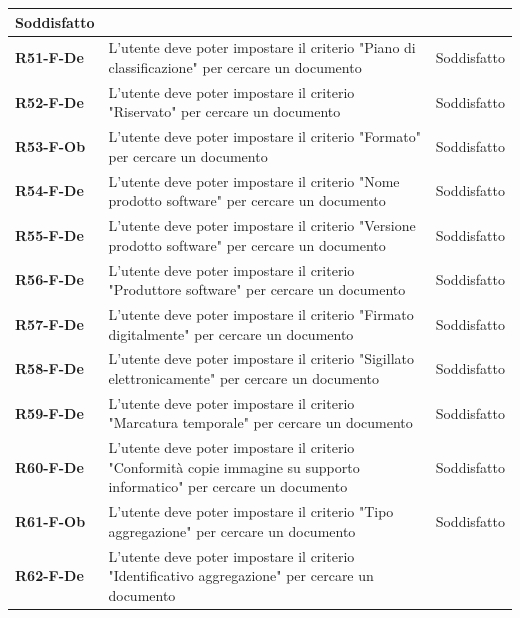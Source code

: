 \documentclass[a4paper,12pt]{article}
\begin{document}
{{{\begin{longtable}{|>{\centering\arraybackslash}m{}|>{\centering\arraybackslash}m{}|>{\centering\arraybackslash}m{}|}
                Soddisfatto \\ 
                \hline
                \textbf{R51-F-De} & L'utente deve poter impostare il criterio "Piano di classificazione" per cercare un documento & 
                Soddisfatto \\ 
                \hline
                \textbf{R52-F-De} & L'utente deve poter impostare il criterio "Riservato" per cercare un documento & 
                Soddisfatto \\ 
                \hline
                \textbf{R53-F-Ob} & L'utente deve poter impostare il criterio "Formato" per cercare un documento & 
                Soddisfatto \\ 
                \hline
                \textbf{R54-F-De} & L'utente deve poter impostare il criterio "Nome prodotto software" per cercare un documento & 
                Soddisfatto \\ 
                \hline
                \textbf{R55-F-De} & L'utente deve poter impostare il criterio "Versione prodotto software" per cercare un documento & 
                Soddisfatto \\ 
                \hline
                \textbf{R56-F-De} & L'utente deve poter impostare il criterio "Produttore software" per cercare un documento & 
                Soddisfatto \\ 
                \hline
                \textbf{R57-F-De} & L'utente deve poter impostare il criterio "Firmato digitalmente" per cercare un documento & 
                Soddisfatto \\ 
                \hline
                \textbf{R58-F-De} & L'utente deve poter impostare il criterio "Sigillato elettronicamente" per cercare un documento & 
                Soddisfatto \\ 
                \hline
                \textbf{R59-F-De} & L'utente deve poter impostare il criterio "Marcatura temporale" per cercare un documento & 
                Soddisfatto \\ 
                \hline
                \textbf{R60-F-De} & L'utente deve poter impostare il criterio "Conformità copie immagine su supporto informatico" per cercare un documento & 
                Soddisfatto \\ 
                \hline
                \textbf{R61-F-Ob} & L'utente deve poter impostare il criterio "Tipo aggregazione" per cercare un documento & 
                Soddisfatto \\ 
                \hline
                \textbf{R62-F-De} & L'utente deve poter impostare il criterio "Identificativo aggregazione" per cercare un documento & 

\end{longtable}}}}
\end{document}
